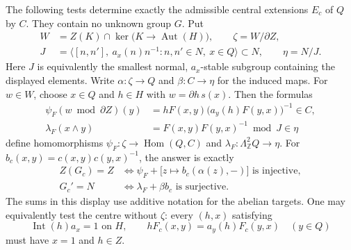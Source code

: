 \begin{theorem}
The following tests determine exactly the admissible central extensions
$E_c$ of $Q$ by $C$.  They contain no unknown group $G$.
Put
\[
 \begin{split}
 W&=Z(K)\cap\ker\bigl(K\longrightarrow\operatorname{Aut}(H)\bigr),\qquad
 \zeta=W/\partial Z,\\
 J&=\bigl\langle [n,n'],\ a_x(n)n^{-1}:n,n'\in N,\ x\in Q\bigr\rangle
       \subset N,\qquad \eta=N/J.
 \end{split}                                             \tag{C.4.6}
\]
Here $J$ is equivalently the smallest normal, $a_x$-stable subgroup
containing the displayed elements.  Write
$\alpha:\zeta\to Q$ and $\beta:C\to\eta$ for the induced maps.
For $w\in W$, choose $x\in Q$ and $h\in H$ with $w=\partial h\,s(x)$.
Then the formulas
\[
 \begin{split}
 \psi_F(w\bmod\partial Z)(y)
   &=hF(x,y)\bigl(a_y(h)F(y,x)\bigr)^{-1}\in C,\\
 \lambda_F(x\wedge y)&=F(x,y)F(y,x)^{-1}\bmod J\in\eta
 \end{split}                                             \tag{C.4.7}
\]
define homomorphisms
$\psi_F:\zeta\to\operatorname{Hom}(Q,C)$ and
$\lambda_F:\Lambda^2_{\mathbb Z}Q\to\eta$.
For $b_c(x,y)=c(x,y)c(y,x)^{-1}$, the answer is exactly
\[
 \boxed{\begin{aligned}
 Z(G_c)=Z&\iff
   \psi_F+\bigl[z\mapsto b_c(\alpha(z),-)\bigr]\text{ is injective},\\
 G_c'=N&\iff \lambda_F+\beta b_c\text{ is surjective}.
 \end{aligned}}                                         \tag{C.4.8}
\]
The sums in this display use additive notation for the abelian targets.
One may equivalently test the centre without $\zeta$: every $(h,x)$
satisfying
\[
 \operatorname{Int}(h)a_x=1\text{ on }H,\qquad
 hF_c(x,y)=a_y(h)F_c(y,x)\quad(y\in Q)
                                                        \tag{C.4.9}
\]
must have $x=1$ and $h\in Z$.
\end{theorem}
